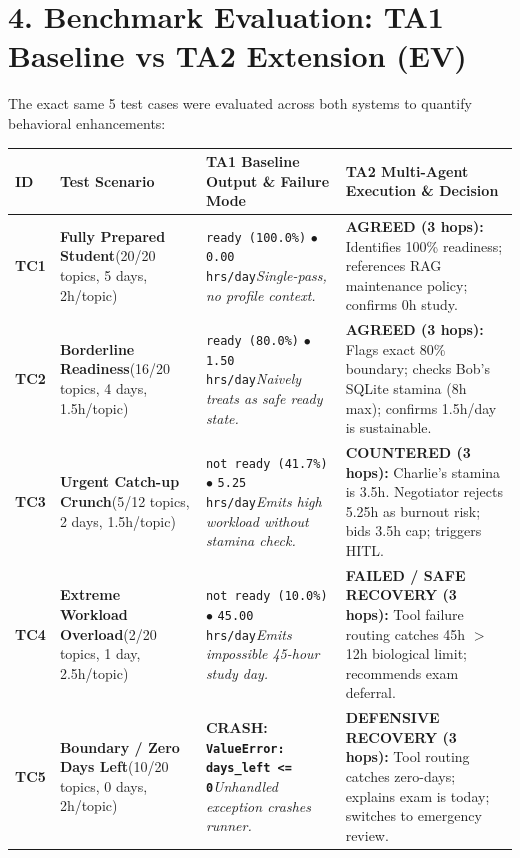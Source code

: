 \documentclass[10pt,a4paper]{article}
\begin{document}
\vspace{4pt}
\section*{\large \color{primary} 4. Benchmark Evaluation: TA1 Baseline vs TA2 Extension (EV)}
\vspace{-2pt}
The exact same 5 test cases were evaluated across both systems to quantify behavioral enhancements:

\vspace{2pt}
\small
\begin{tabularx}{\textwidth}{@{} l p{} p{} X @{}}
\toprule
\rowcolor{primary} \textbf{\color{white} ID} & \textbf{\color{white} Test Scenario} & \textbf{\color{white} TA1 Baseline Output \& Failure Mode} & \textbf{\color{white} TA2 Multi-Agent Execution \& Decision} \\
\midrule
\rowcolor{lightbg} \textbf{TC1} & \textbf{Fully Prepared Student}\newline(20/20 topics, 5 days, 2h/topic) & \texttt{ready (100.0\%)} $\bullet$ \texttt{0.00 hrs/day}\newline\textit{Single-pass, no profile context.} & \textbf{AGREED (3 hops):} Identifies 100\% readiness; references RAG maintenance policy; confirms 0h study. \\
\textbf{TC2} & \textbf{Borderline Readiness}\newline(16/20 topics, 4 days, 1.5h/topic) & \texttt{ready (80.0\%)} $\bullet$ \texttt{1.50 hrs/day}\newline\textit{Naively treats as safe ready state.} & \textbf{AGREED (3 hops):} Flags exact 80\% boundary; checks Bob's SQLite stamina (8h max); confirms 1.5h/day is sustainable. \\
\rowcolor{lightbg} \textbf{TC3} & \textbf{Urgent Catch-up Crunch}\newline(5/12 topics, 2 days, 1.5h/topic) & \texttt{not ready (41.7\%)} $\bullet$ \texttt{5.25 hrs/day}\newline\textit{Emits high workload without stamina check.} & \textbf{COUNTERED (3 hops):} Charlie's stamina is 3.5h. Negotiator rejects 5.25h as burnout risk; bids 3.5h cap; triggers HITL. \\
\textbf{TC4} & \textbf{Extreme Workload Overload}\newline(2/20 topics, 1 day, 2.5h/topic) & \texttt{not ready (10.0\%)} $\bullet$ \texttt{45.00 hrs/day}\newline\textit{Emits impossible 45-hour study day.} & \textbf{FAILED / SAFE RECOVERY (3 hops):} Tool failure routing catches 45h $>$ 12h biological limit; recommends exam deferral. \\
\rowcolor{lightbg} \textbf{TC5} & \textbf{Boundary / Zero Days Left}\newline(10/20 topics, 0 days, 2h/topic) & \textbf{CRASH: \texttt{ValueError: days\_left <= 0}}\newline\textit{Unhandled exception crashes runner.} & \textbf{DEFENSIVE RECOVERY (3 hops):} Tool routing catches zero-days; explains exam is today; switches to emergency review. \\
\bottomrule
\end{tabularx}
\end{document}
